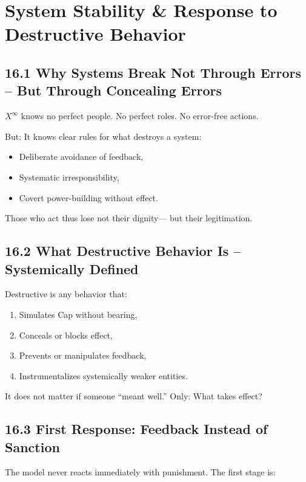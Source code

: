 \documentclass[12pt,a4paper]{book}
\begin{document}
\chapter{System Stability \& Response to Destructive Behavior}

\section*{16.1 Why Systems Break Not Through Errors – But Through Concealing Errors}

$X^\infty$ knows no perfect people.  
No perfect roles. No error-free actions.

But:  
It knows clear rules for what destroys a system:

\begin{itemize}
    \item Deliberate avoidance of feedback,
    \item Systematic irresponsibility,
    \item Covert power-building without effect.
\end{itemize}

Those who act thus lose not their dignity—  
but their legitimation.

\section*{16.2 What Destructive Behavior Is – Systemically Defined}

Destructive is any behavior that:

\begin{enumerate}
    \item Simulates Cap without bearing,
    \item Conceals or blocks effect,
    \item Prevents or manipulates feedback,
    \item Instrumentalizes systemically weaker entities.
\end{enumerate}

It does not matter if someone “meant well.”  
Only: What takes effect?

\section*{16.3 First Response: Feedback Instead of Sanction}

The model never reacts immediately with punishment.  
The first stage is:
\end{document}

